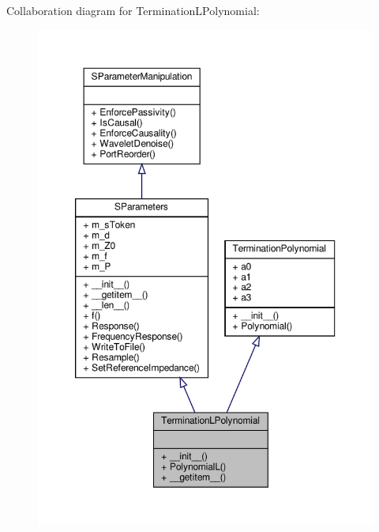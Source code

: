 Collaboration diagram for Termination\+L\+Polynomial\+:\nopagebreak
\begin{figure}[H]
\begin{center}
\leavevmode
\includegraphics[width=350pt]{classSignalIntegrity_1_1Measurement_1_1CalKit_1_1Standards_1_1TerminationPolynomial_1_1TerminationLPolynomial__coll__graph}
\end{center}
\end{figure}

